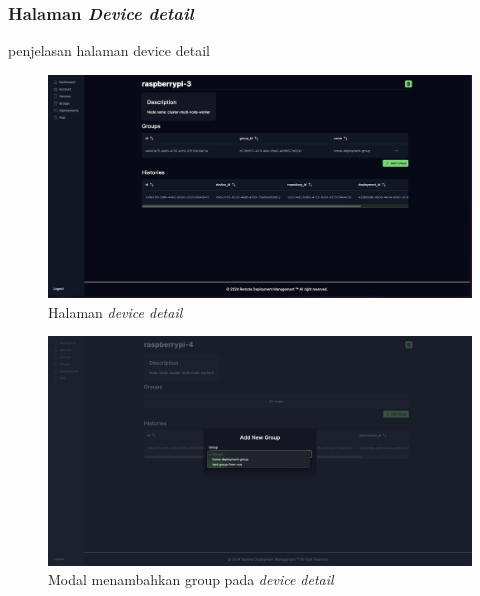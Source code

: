\pagebreak

\subsubsection{Halaman \textit{Device detail}}
penjelasan halaman device detail
\begin{figure}[h]
  \centering
  \includegraphics[width=1\textwidth]{resources/chapter-4/dashboard/device-detail-page.jpg}
  \caption{Halaman \textit{device detail}}
  \label{fig:halaman-device-detail}
\end{figure}

\begin{figure}[h]
  \centering
  \includegraphics[width=1\textwidth]{resources/chapter-4/dashboard/device-detail-add-group.jpg}
  \caption{Modal menambahkan group pada \textit{device detail}}
  \label{fig:halaman-device-detail-add-group}
\end{figure}

